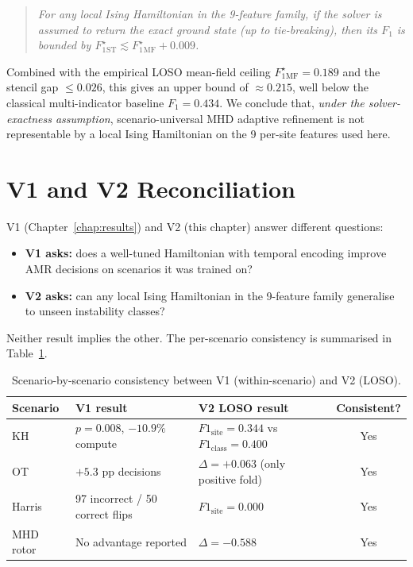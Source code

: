 \documentclass[12pt, a4paper, oneside]{report}
\begin{document}
\begin{quote}
\emph{For any local Ising Hamiltonian in the 9-feature family, if the solver is assumed to return the exact ground state (up to tie-breaking), then its $F_1$ is bounded by $F_1^{\star}_{\mathrm{ST}} \lesssim F_1^{\star}_{\mathrm{MF}} + 0.009$.}
\end{quote}

Combined with the empirical LOSO mean-field ceiling $F_1^{\star}_{\mathrm{MF}} = 0.189$ and the stencil gap $\le 0.026$, this gives an upper bound of $\approx 0.215$, well below the classical multi-indicator baseline $F_1 = 0.434$. We conclude that, \emph{under the solver-exactness assumption}, scenario-universal MHD adaptive refinement is not representable by a local Ising Hamiltonian on the 9 per-site features used here.

\section{V1 and V2 Reconciliation}
\label{sec:reconciliation}

V1 (Chapter~\ref{chap:results}) and V2 (this chapter) answer different questions:
\begin{itemize}
    \item \textbf{V1 asks:} does a well-tuned Hamiltonian with temporal encoding improve AMR decisions on scenarios it was trained on?
    \item \textbf{V2 asks:} can any local Ising Hamiltonian in the 9-feature family generalise to unseen instability classes?
\end{itemize}

\noindent Neither result implies the other. The per-scenario consistency is summarised in Table~\ref{tab:reconciliation}.

\begin{table}[H]
\centering
\caption{Scenario-by-scenario consistency between V1 (within-scenario) and V2 (LOSO).}
\label{tab:reconciliation}
\begin{tabular}{p{2.8cm}p{4.8cm}p{4.8cm}c}
\toprule
\textbf{Scenario} & \textbf{V1 result} & \textbf{V2 LOSO result} & \textbf{Consistent?} \\
\midrule
KH & $p = 0.008$, $-10.9\%$ compute & $F1_\text{site} = 0.344$ vs $F1_\text{class} = 0.400$ & Yes \\
OT & $+5.3$ pp decisions & $\Delta = +0.063$ (only positive fold) & Yes \\
Harris & 97 incorrect / 50 correct flips & $F1_\text{site} = 0.000$ & Yes \\
MHD rotor & No advantage reported & $\Delta = -0.588$ & Yes \\
\bottomrule
\end{tabular}
\end{table}
\end{document}

